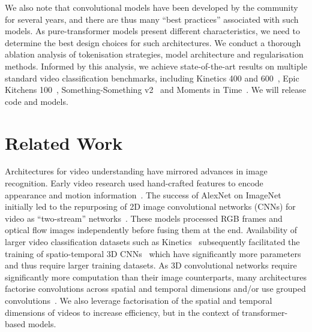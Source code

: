 \documentclass[10pt,twocolumn,letterpaper]{article}
\begin{document}
We also note that convolutional models have been developed by the community for several years, and there are thus many ``best practices'' associated with such models.
As pure-transformer models present different characteristics, we need to determine the best design choices for such architectures. 
We conduct a thorough ablation analysis of tokenisation strategies, model architecture and regularisation methods.
Informed by this analysis, we achieve state-of-the-art results on multiple standard video classification benchmarks, including Kinetics 400 and 600~\cite{kay_arxiv_2017}, Epic Kitchens 100~\cite{damen_arxiv_2020}, Something-Something v2~\cite{goyal_iccv_2017} and Moments in Time~\cite{monfort_pami_2019}.
We will release code and models.



 \section{Related Work}

Architectures for video understanding have mirrored advances in image recognition.
Early video research used hand-crafted features to encode appearance and motion information~\cite{laptev_ijcv_2005, wang_ijcv_2013}.
The success of AlexNet on ImageNet~\cite{krizhevsky_neurips_2012, deng_cvpr_2009} initially led to the repurposing of 2D image convolutional networks (CNNs) for video as ``two-stream'' networks~\cite{karpathy_cvpr_2014, simonyan_neurips_2014, ng_cvpr_2015}.
These models processed RGB frames and optical flow images independently before fusing them at the end.
Availability of larger video classification datasets such as Kinetics~\cite{kay_arxiv_2017} subsequently facilitated the training of spatio-temporal 3D CNNs~\cite{carreira_cvpr_2017, feichtenhofer_neurips_2016,tran_iccv_2015} which have significantly more parameters and thus require larger training datasets.
As 3D convolutional networks require significantly more computation than their image counterparts, many architectures factorise convolutions across spatial and temporal dimensions and/or use grouped convolutions~\cite{sun_iccv_2015,tran_iccv_2019,tran_cvpr_2018,xie_s3d_eccv_2018, feichtenhofer_cvpr_2020}.
We also leverage factorisation of the spatial and temporal dimensions of videos to increase efficiency, but in the context of transformer-based models.
\end{document}
